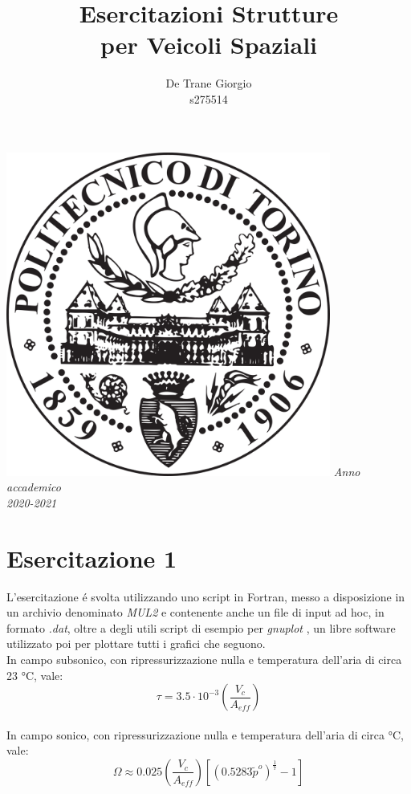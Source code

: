 \documentclass{article}
\author{De Trane Giorgio\\s275514}
\title{\textbf{Esercitazioni Strutture\\per Veicoli Spaziali}}
\begin{document}
    \maketitle
    \begin{center}
        \includegraphics[width=0.8\textwidth]{polito_logo.png}
        \linebreak
        \linebreak
        \textit{Anno accademico\\2020-2021}
    \end{center}
    \pagebreak
    \section{Esercitazione 1}
    L'esercitazione é svolta utilizzando uno script in Fortran, messo a disposizione
    in un archivio denominato \textit{MUL2} \autocite*{MUL2} e contenente anche un file di input ad hoc, in formato \textit{.dat},
    oltre a degli utili script di esempio per \textit{gnuplot} \autocite*{gnuplot}, un libre software utilizzato poi per plottare tutti i grafici che seguono.
    \\
    \linebreak 
    In campo subsonico, con ripressurizzazione
    nulla e temperatura dell'aria di circa 23 °C, vale:
        \\ 
        \begin{equation}
            \tau = 3.5 \cdot  10^{-3}\left ( \frac{V_c}{A_{eff}} \right )
        \end{equation}
        \\ 
        In campo sonico, con ripressurizzazione nulla e temperatura
        dell'aria di circa °C, vale:
        \\ 
        \begin{equation}
            \Omega \approx 0.025\left ( \frac{V_c}{A_{eff}} \right )\left [ (0.5283{\tilde{p}}^{o})^{\frac{1}{7}} - 1 \right ]
        \end{equation} 
        \\ 
\end{document}
